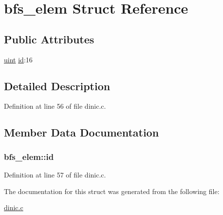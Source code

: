 \hypertarget{structbfs__elem}{
\section{bfs\_\-elem Struct Reference}
\label{structbfs__elem}
}
\subsection*{Public Attributes}
\begin{DoxyCompactItemize}
\item 
\hyperlink{dinic_8c_a91ad9478d81a7aaf2593e8d9c3d06a14}{uint} \hyperlink{structbfs__elem_aa7b38cae33f56888b2d18ae2855d9996}{id}:16
\end{DoxyCompactItemize}


\subsection{Detailed Description}


Definition at line 56 of file dinic.c.



\subsection{Member Data Documentation}
\hypertarget{structbfs__elem_aa7b38cae33f56888b2d18ae2855d9996}{
\subsubsection[{id}]{ {\bf bfs\_\-elem::id}}}
\label{structbfs__elem_aa7b38cae33f56888b2d18ae2855d9996}


Definition at line 57 of file dinic.c.



The documentation for this struct was generated from the following file:\begin{DoxyCompactItemize}
\item 
\hyperlink{dinic_8c}{dinic.c}\end{DoxyCompactItemize}
